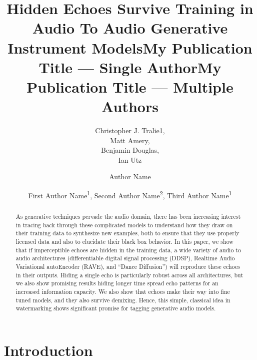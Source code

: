 \documentclass[letterpaper]{article} %
\title{Hidden Echoes Survive Training in Audio To Audio Generative Instrument Models}
\author{
    Christopher J. Tralie{\rm 1},\\
    Matt Amery,\\
    Benjamin Douglas,\\
    Ian Utz
}
\title{My Publication Title --- Single Author}
\author {
    Author Name
}
\title{My Publication Title --- Multiple Authors}
\author {
    First Author Name\textsuperscript{\rm 1},
    Second Author Name\textsuperscript{\rm 2},
    Third Author Name\textsuperscript{\rm 1}
}
\begin{document}
\maketitle

\begin{abstract}
As generative techniques pervade the audio domain, there has been increasing interest in tracing back through these complicated models to understand how they draw on their training data to synthesize new examples, both to ensure that they use properly licensed data and also to elucidate their black box behavior. In this paper, we show that if imperceptible echoes are hidden in the training data, a wide variety of audio to audio architectures (differentiable digital signal processing (DDSP), Realtime Audio Variational autoEncoder (RAVE), and ``Dance Diffusion'') will reproduce these echoes in their outputs. Hiding a single echo is particularly robust across all architectures, but we also show promising results hiding longer time spread echo patterns for an increased information capacity. We also show that echoes make their way into fine tuned models, and they also survive demixing. Hence, this simple, classical idea in watermarking shows significant promise for tagging generative audio models. 

\end{abstract}

%

\section{Introduction}
\end{document}
